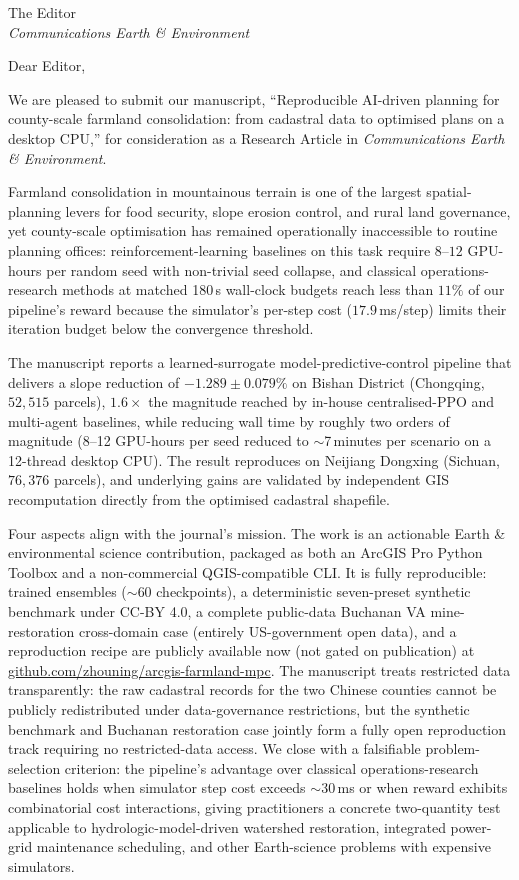 \documentclass[11pt]{letter}
\begin{document}
\begin{letter}{The Editor \\ \textit{Communications Earth \& Environment}}

\opening{Dear Editor,}

We are pleased to submit our manuscript, ``Reproducible AI-driven planning for county-scale farmland consolidation: from cadastral data to optimised plans on a desktop CPU,'' for consideration as a Research Article in \textit{Communications Earth \& Environment}.

Farmland consolidation in mountainous terrain is one of the largest spatial-planning levers for food security, slope erosion control, and rural land governance, yet county-scale optimisation has remained operationally inaccessible to routine planning offices: reinforcement-learning baselines on this task require $8$--$12$ GPU-hours per random seed with non-trivial seed collapse, and classical operations-research methods at matched 180\,s wall-clock budgets reach less than $11\%$ of our pipeline's reward because the simulator's per-step cost ($17.9$\,ms/step) limits their iteration budget below the convergence threshold.

The manuscript reports a learned-surrogate model-predictive-control pipeline that delivers a slope reduction of $-1.289 \pm 0.079\%$ on Bishan District (Chongqing, $52{,}515$ parcels), $1.6\times$ the magnitude reached by in-house centralised-PPO and multi-agent baselines, while reducing wall time by roughly two orders of magnitude (8--12 GPU-hours per seed reduced to $\sim$7\,minutes per scenario on a 12-thread desktop CPU). The result reproduces on Neijiang Dongxing (Sichuan, $76{,}376$ parcels), and underlying gains are validated by independent GIS recomputation directly from the optimised cadastral shapefile.

Four aspects align with the journal's mission. The work is an actionable Earth \& environmental science contribution, packaged as both an ArcGIS Pro Python Toolbox and a non-commercial QGIS-compatible CLI. It is fully reproducible: trained ensembles ($\sim$$60$ checkpoints), a deterministic seven-preset synthetic benchmark under CC-BY 4.0, a complete public-data Buchanan VA mine-restoration cross-domain case (entirely US-government open data), and a reproduction recipe are publicly available now (not gated on publication) at \href{https://github.com/zhouning/arcgis-farmland-mpc}{github.com/zhouning/arcgis-farmland-mpc}. The manuscript treats restricted data transparently: the raw cadastral records for the two Chinese counties cannot be publicly redistributed under data-governance restrictions, but the synthetic benchmark and Buchanan restoration case jointly form a fully open reproduction track requiring no restricted-data access. We close with a falsifiable problem-selection criterion: the pipeline's advantage over classical operations-research baselines holds when simulator step cost exceeds $\sim$$30$\,ms or when reward exhibits combinatorial cost interactions, giving practitioners a concrete two-quantity test applicable to hydrologic-model-driven watershed restoration, integrated power-grid maintenance scheduling, and other Earth-science problems with expensive simulators.


\end{letter}
\end{document}
